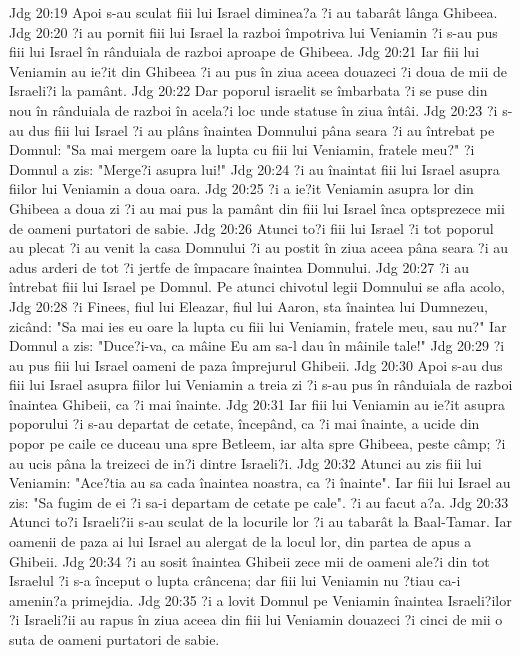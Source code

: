 Jdg 20:19  Apoi s-au sculat fiii lui Israel diminea?a ?i au tabarât lânga Ghibeea.
Jdg 20:20  ?i au pornit fiii lui Israel la razboi împotriva lui Veniamin ?i s-au pus fiii lui Israel în rânduiala de razboi aproape de Ghibeea.
Jdg 20:21  Iar fiii lui Veniamin au ie?it din Ghibeea ?i au pus în ziua aceea douazeci ?i doua de mii de Israeli?i la pamânt.
Jdg 20:22  Dar poporul israelit se îmbarbata ?i se puse din nou în rânduiala de razboi în acela?i loc unde statuse în ziua întâi.
Jdg 20:23  ?i s-au dus fiii lui Israel ?i au plâns înaintea Domnului pâna seara ?i au întrebat pe Domnul: "Sa mai mergem oare la lupta cu fiii lui Veniamin, fratele meu?" ?i Domnul a zis: "Merge?i asupra lui!"
Jdg 20:24  ?i au înaintat fiii lui Israel asupra fiilor lui Veniamin a doua oara.
Jdg 20:25  ?i a ie?it Veniamin asupra lor din Ghibeea a doua zi ?i au mai pus la pamânt din fiii lui Israel înca optsprezece mii de oameni purtatori de sabie.
Jdg 20:26  Atunci to?i fiii lui Israel ?i tot poporul au plecat ?i au venit la casa Domnului ?i au postit în ziua aceea pâna seara ?i au adus arderi de tot ?i jertfe de împacare înaintea Domnului.
Jdg 20:27  ?i au întrebat fiii lui Israel pe Domnul. Pe atunci chivotul legii Domnului se afla acolo,
Jdg 20:28  ?i Finees, fiul lui Eleazar, fiul lui Aaron, sta înaintea lui Dumnezeu, zicând: "Sa mai ies eu oare la lupta cu fiii lui Veniamin, fratele meu, sau nu?" Iar Domnul a zis: "Duce?i-va, ca mâine Eu am sa-l dau în mâinile tale!"
Jdg 20:29  ?i au pus fiii lui Israel oameni de paza împrejurul Ghibeii.
Jdg 20:30  Apoi s-au dus fiii lui Israel asupra fiilor lui Veniamin a treia zi ?i s-au pus în rânduiala de razboi înaintea Ghibeii, ca ?i mai înainte.
Jdg 20:31  Iar fiii lui Veniamin au ie?it asupra poporului ?i s-au departat de cetate, începând, ca ?i mai înainte, a ucide din popor pe caile ce duceau una spre Betleem, iar alta spre Ghibeea, peste câmp; ?i au ucis pâna la treizeci de in?i dintre Israeli?i.
Jdg 20:32  Atunci au zis fiii lui Veniamin: "Ace?tia au sa cada înaintea noastra, ca ?i înainte". Iar fiii lui Israel au zis: "Sa fugim de ei ?i sa-i departam de cetate pe cale". ?i au facut a?a.
Jdg 20:33  Atunci to?i Israeli?ii s-au sculat de la locurile lor ?i au tabarât la Baal-Tamar. Iar oamenii de paza ai lui Israel au alergat de la locul lor, din partea de apus a Ghibeii.
Jdg 20:34  ?i au sosit înaintea Ghibeii zece mii de oameni ale?i din tot Israelul ?i s-a început o lupta crâncena; dar fiii lui Veniamin nu ?tiau ca-i amenin?a primejdia.
Jdg 20:35  ?i a lovit Domnul pe Veniamin înaintea Israeli?ilor ?i Israeli?ii au rapus în ziua aceea din fiii lui Veniamin douazeci ?i cinci de mii o suta de oameni purtatori de sabie.
